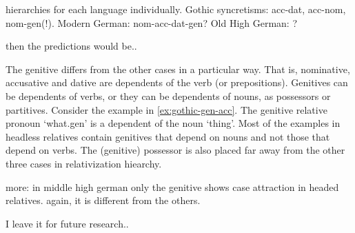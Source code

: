 hierarchies for each language individually. Gothic syncretisms: acc-dat, acc-nom, nom-gen(!). Modern German: nom-acc-dat-gen? Old High German: ?

then the predictions would be..

The genitive differs from the other cases in a particular way. That is, nominative, accusative and dative are dependents of the verb (or prepositions). Genitives can be dependents of verbs, or they can be dependents of nouns, as possessors or partitives. Consider the example in \ref{ex:gothic-gen-acc}. The genitive relative pronoun  `what.\ac{gen}' is a dependent of the noun  `thing'. Most of the examples in headless relatives contain genitives that depend on nouns and not those that depend on verbs. The (genitive) possessor is also placed far away from the other three cases in  relativization hiearchy.

more: in middle high german only the genitive shows case attraction in headed relatives. again, it is different from the others.

I leave it for future research..
